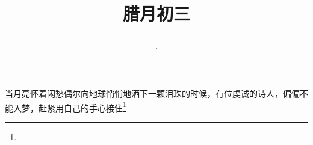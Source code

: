 \title{\date[d=13,m=1,y=2024][year:cn-y,年,month:cn,day:cn,日,·,weekday]·腊月初三 }
当月亮怀着闲愁偶尔向地球悄悄地洒下一颗泪珠的时候，有位虔诚的诗人，偏偏不能入梦，赶紧用自己的手心接住\footnote{ }

